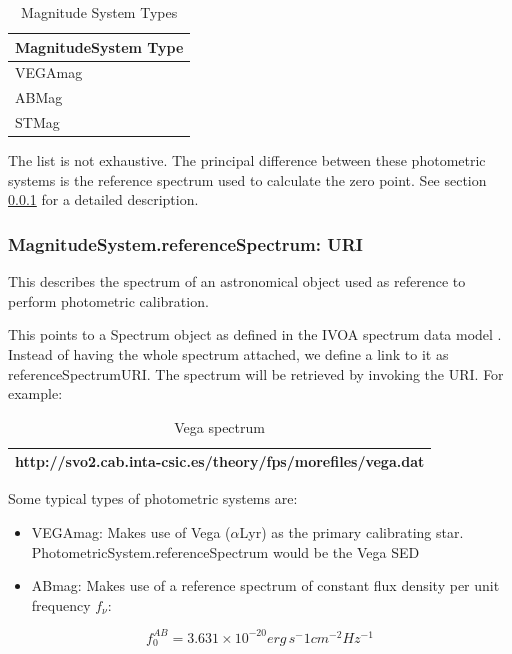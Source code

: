 \documentclass[11pt,a4paper]{ivoa}
\begin{document}


\begin{table}[H]
 			\centering
\begin{tabular}{|p{2.42in}|}
\hline
MagnitudeSystem Type \\
\hline
VEGAmag \\
\hline
ABMag \\
\hline
STMag \\
\hline
\end{tabular}
\caption{Magnitude System Types}
 \end{table}



The list is not exhaustive. The principal difference between these 
photometric systems is the reference spectrum used to calculate the 
zero point. See section \ref{referenceSpectrum} for a detailed description.
\par

\subsubsection{MagnitudeSystem.referenceSpectrum: URI} \label{referenceSpectrum}
This describes the spectrum of an astronomical object used as 
reference to perform photometric calibration.
\par

This points to a Spectrum object as defined in the IVOA spectrum data 
model \citep{2011ivoa.spec.1120M}. Instead of having the whole spectrum 
attached, we define a link to it as referenceSpectrumURI. 
The spectrum will be retrieved by invoking the URI. For example:
\par


\begin{table}[H]
 			\centering
\begin{tabular}{p{4.42in}}
\hline
http://svo2.cab.inta-csic.es/theory/fps/morefiles/vega.dat \\
\hline
\end{tabular}
\caption{Vega spectrum}
 \end{table}

Some typical types of photometric systems are:
\par

\begin{itemize}
	\item{VEGAmag: Makes use of Vega ($\alpha $Lyr) as the primary calibrating 
	star. PhotometricSystem.referenceSpectrum would be the Vega SED\par}

	\item{ABmag: Makes use of a reference spectrum of constant flux 
	density per unit frequency $f_\nu $:}
\end{itemize}
\begin{equation} \label{eq:31}
f_0^{AB} = 3.631 \times 10^{-20} erg\, s^-1 cm^{-2} Hz^{-1}
\end{equation}
\end{document}
